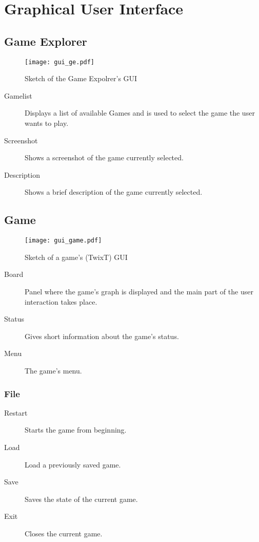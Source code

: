 \section{Graphical User Interface}
\subsection{Game Explorer}

\begin{figure}[h]
	\centering
	\texttt{[image: gui\_ge.pdf]}
	\caption{Sketch of the Game Expolrer's GUI}
	\label{img:GE_GUI}
\end{figure}

\begin{description}
	\item[Gamelist] Displays a list of available Games and is used to select the game the user wants to play.
	\item[Screenshot] Shows a screenshot of the game currently selected.
	\item[Description] Shows a brief description of the game currently selected.
\end{description}

\subsection{Game}

\begin{figure}[H]
	\centering
	\texttt{[image: gui\_game.pdf]}
	\caption{Sketch of a game's (TwixT) GUI}
	\label{img:GAME_GUI}
\end{figure}

\begin{description}
	\item[Board] Panel where the game's graph is displayed and the main part of the user interaction takes place.
	\item[Status] Gives short information about the game's status.
	\item[Menu] The game's menu.
\end{description}

\subsubsection{File}
\begin{description}
	\item[Restart] Starts the game from beginning.
	\item[Load] Load a previously saved game.
	\item[Save] Saves the state of the current game.
	\item[Exit] Closes the current game.
\end{description}
